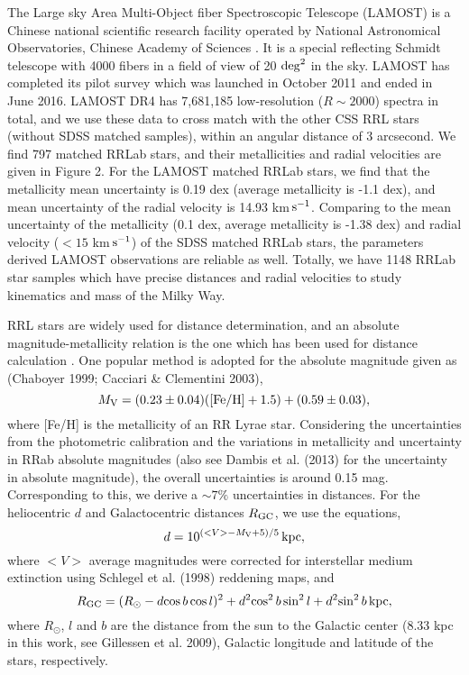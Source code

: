 \documentclass[12pt,preprint]{aastex}
\begin{document}
The Large sky Area Multi-Object fiber Spectroscopic Telescope
(LAMOST) is a Chinese national scientific research facility operated
by National Astronomical Observatories, Chinese Academy of Sciences
\citep{z06,z12}. It is a special reflecting Schmidt telescope with
4000 fibers in a field of view of 20 $\rm{deg}^2$ in the sky. LAMOST
has completed its pilot survey which was launched in October 2011
and ended in June 2016. LAMOST DR4 has 7,681,185 low-resolution ($R
\sim 2000$) spectra in total, and we use these data to cross
match with the other CSS RRL stars (without SDSS matched samples),
within an angular distance of 3 arcsecond. We find 797 matched RRLab
stars,
and their metallicities and radial velocities are given in Figure 2.
For the LAMOST matched RRLab stars, we find that the metallicity
mean uncertainty is 0.19 dex (average metallicity is -1.1 dex), and
mean uncertainty of the radial velocity is 14.93 km$\,\rm s^{-1}$.
Comparing to the mean uncertainty
of the metallicity (0.1 dex, average metallicity is -1.38 dex) and radial velocity ($<15$
km$\,\rm s^{-1}$) of the SDSS matched RRLab
stars, the parameters derived LAMOST observations are reliable as well.
Totally, we have 1148 RRLab star samples which have precise distances and radial velocities
to study kinematics and mass of the Milky Way.

RRL stars are widely used for distance determination, and an
absolute magnitude-metallicity relation is the one which has been
used for distance calculation \citep{sa81}. One popular method is
adopted for the absolute magnitude given as (Chaboyer 1999; Cacciari
\& Clementini 2003),
\begin{equation}
M_{\rm V} = (0.23 \pm 0.04)([\rm Fe/H] + 1.5) + (0.59 \pm 0.03),
\end{equation}
where [Fe/H] is the metallicity of an RR Lyrae
star. Considering the uncertainties from the photometric calibration and the variations in metallicity
and uncertainty in RRab absolute magnitudes (also see Dambis et al. (2013) for the uncertainty in absolute magnitude), the overall uncertainties is around 0.15 mag. Corresponding to this, we derive a $\sim 7\%$ uncertainties in distances. For the heliocentric $d$ and
Galactocentric distances $R_{\rm GC}$, we use the equations,
\begin{equation}
d = 10^{(<V> - M_{\rm V} + 5)/5}\, {\rm kpc},
\end{equation}
where $<V>$ average magnitudes were corrected for interstellar medium extinction
using Schlegel et al. (1998) reddening maps, and
\begin{equation}
R_{\rm GC} = (R_\odot - d{\rm cos}\,b\, {\rm cos}\,l)^2 + d^2{\rm cos}^2\,b\, {\rm sin}^2\,l +
d^2{\rm sin}^2\,b \, {\rm kpc},
\end{equation}
where $R_\odot$, $l$ and $b$ are the distance from the sun to the Galactic center (8.33 kpc in this work, see Gillessen et al. 2009), Galactic longitude and latitude of the stars, respectively.
\end{document}

